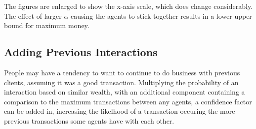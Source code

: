\documentclass[12pt]{article} %
\begin{document}
The figures are enlarged to show the x-axis scale, which does change
considerably. The effect of larger $\alpha$ causing the agents to stick
together results in a lower upper bound for maximum money.

\subsection{Adding Previous Interactions}
People may have a tendency to want to continue to do business with previous
clients, assuming it was a good transaction. Multiplying the probability of an
interaction based on similar wealth, with an additional component containing a
comparison to the maximum transactions between any agents, a confidence factor
can be added in, increasing the likelhood of a transaction occuring the more
previous transactions some agents have with each other.
\end{document}
